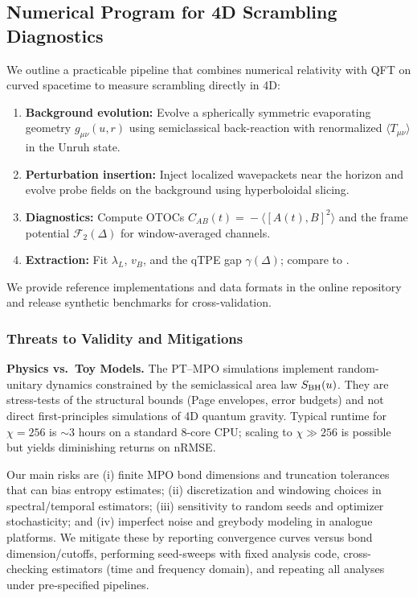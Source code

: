 \documentclass[11pt,a4paper]{article}
\theoremstyle{plain}
\theoremstyle{definition}
\theoremstyle{remark}
\begin{document}
\subsection{Numerical Program for 4D Scrambling Diagnostics}
\label{sec:scrambling-numerics}
We outline a practicable pipeline that combines numerical relativity with QFT on curved spacetime to measure scrambling directly in 4D:
\begin{enumerate}[leftmargin=*]
\item \textbf{Background evolution:} Evolve a spherically symmetric evaporating geometry $g_{\mu\nu}(u,r)$ using semiclassical back-reaction with renormalized $\langle T_{\mu\nu}\rangle$ in the Unruh state.
\item \textbf{Perturbation insertion:} Inject localized wavepackets near the horizon and evolve probe fields on the background using hyperboloidal slicing.
\item \textbf{Diagnostics:} Compute OTOCs $C_{AB}(t)\!=\!-\langle [A(t),B]^2\rangle$ and the frame potential $\mathcal{F}_2(\Delta)$ for window-averaged channels.
\item \textbf{Extraction:} Fit $\lambda_L$, $v_B$, and the qTPE gap $\gamma(\Delta)$; compare to .
\end{enumerate}
We provide reference implementations and data formats in the online repository and release synthetic benchmarks for cross-validation.

\subsubsection{Threats to Validity and Mitigations}
\textbf{Physics vs.\ Toy Models.} The PT--MPO simulations implement random-unitary dynamics constrained by the semiclassical area law $S_{\rm BH}(u)$. They are stress-tests of the structural bounds (Page envelopes, error budgets) and not direct first-principles simulations of 4D quantum gravity.
Typical runtime for $\chi=256$ is $\sim 3$ hours on a standard 8-core CPU; scaling to $\chi \gg 256$ is possible but yields diminishing returns on nRMSE.

Our main risks are (i) finite MPO bond dimensions and truncation tolerances that can bias entropy estimates; (ii) discretization and windowing choices in spectral/temporal estimators; (iii) sensitivity to random seeds and optimizer stochasticity; and (iv) imperfect noise and greybody modeling in analogue platforms. We mitigate these by reporting convergence curves versus bond dimension/cutoffs, performing seed-sweeps with fixed analysis code, cross-checking estimators (time and frequency domain), and repeating all analyses under pre-specified pipelines.
\end{document}
